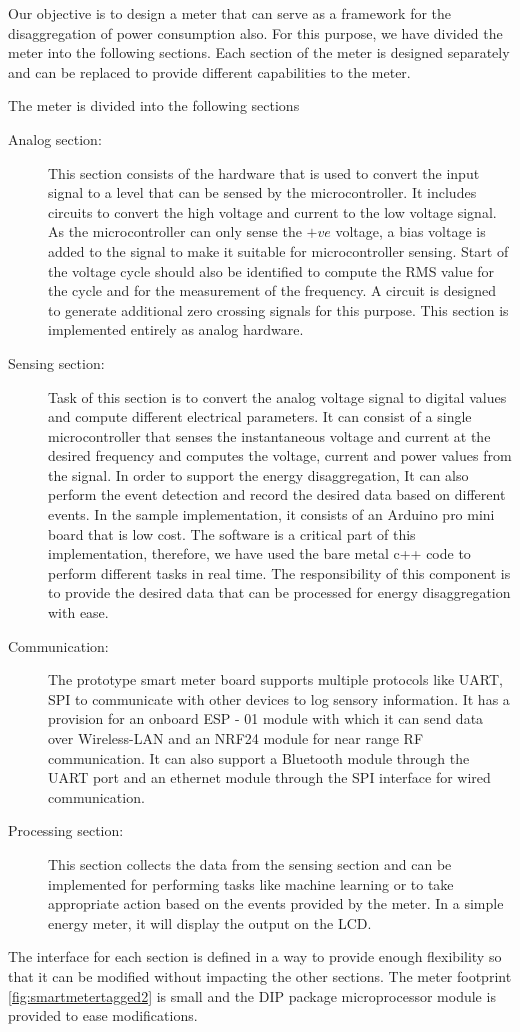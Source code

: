 Our objective is to design a meter that can serve as a framework for the disaggregation of power consumption also. For this purpose, we have divided the meter into the following sections. Each section of the meter is designed separately and can be replaced to provide different capabilities to the meter.

The meter is divided into the following sections

\begin{description}

    \item [Analog section:] This section consists of the hardware that is used to convert the input signal to a level that can be sensed by the microcontroller. It includes circuits to convert the high voltage and current to the low voltage signal. As the microcontroller can only sense the $+ve$ voltage, a bias voltage is added to the signal to make it suitable for microcontroller sensing. Start of the voltage cycle should also be identified to compute the RMS value for the cycle and for the measurement of the frequency. A circuit is designed to generate additional zero crossing signals for this purpose. This section is implemented entirely as analog hardware.

    \item [Sensing section:] Task of this section is to convert the analog voltage signal to digital values and compute different electrical parameters. It can consist of a single microcontroller that senses the instantaneous voltage and current at the desired frequency and computes the voltage, current and power values from the signal. In order to support the energy disaggregation, It can also perform the event detection and record the desired data based on different events. In the sample implementation, it consists of an Arduino pro mini board that is low cost.  The software is a critical part of this implementation, therefore, we have used the bare metal c++ code to perform different tasks in real time. The responsibility of this component is to provide the desired data that can be processed for energy disaggregation with ease.

    \item [Communication:] The prototype smart meter board supports multiple protocols like UART, SPI to communicate with other devices to log sensory information. It has a provision for an onboard ESP - 01 module with which it can send data over Wireless-LAN and an NRF24 module for near range RF communication. It can also support a Bluetooth module through the UART port and an ethernet module through the SPI interface for wired communication.
    \item [Processing section:] This section collects the data from the sensing section and can be implemented for performing tasks like machine learning or to take appropriate action based on the events provided by the meter. In a simple energy meter, it will display the output on the LCD.
\end{description}

The interface for each section is defined in a way to provide enough flexibility so that it can be modified without impacting the other sections. The meter footprint \ref{fig:smartmetertagged2} is small and the DIP package microprocessor module is provided to ease modifications.
